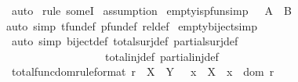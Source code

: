 \begin{isabellebody}
\isamarkupfalse%
\ auto\isanewline
{}\isamarkupfalse%
\ {\isacharparenleft}rule\ someI{\isacharparenright}\isanewline
{}\isamarkupfalse%
\ assumption\isanewline
{}\isamarkupfalse%
%
\endisatagproof
{\isafoldproof}%
%
\isadelimproof
\isanewline
%
\endisadelimproof
\isanewline
{}\isamarkupfalse%
\ empty{\isacharunderscore}is{\isacharunderscore}pfun{\isacharbrackleft}simp{\isacharbrackright}{\isacharcolon}\ {\isachardoublequoteopen}{\isacharbraceleft}{\isacharbraceright}\ {\isasymin}\ A\ {\isacharminus}{\isacharbar}{\isacharminus}{\isachargreater}\ B{\isachardoublequoteclose}\isanewline
%
\isadelimproof
%
\endisadelimproof
%
\isatagproof
{}\isamarkupfalse%
{\isacharparenleft}auto\ simp{\isacharcolon}\ tfun{\isacharunderscore}def\ pfun{\isacharunderscore}def\ rel{\isacharunderscore}def{\isacharparenright}%
\endisatagproof
{\isafoldproof}%
%
\isadelimproof
\isanewline
%
\endisadelimproof
\isanewline
\isanewline
{}\isamarkupfalse%
\ empty{\isacharunderscore}biject{\isacharbrackleft}simp{\isacharbrackright}{\isacharcolon}\ {\isachardoublequoteopen}{\isacharbraceleft}{\isacharbraceright}\ {\isacharcolon}\ {\isacharparenleft}{\isacharbraceleft}{\isacharbraceright}\ {\isachargreater}{\isacharminus}{\isacharminus}{\isachargreater}{\isachargreater}\ {\isacharbraceleft}{\isacharbraceright}{\isacharparenright}{\isachardoublequoteclose}\isanewline
%
\isadelimproof
%
\endisadelimproof
%
\isatagproof
{}\isamarkupfalse%
\ {\isacharparenleft}auto\ simp{\isacharcolon}\ biject{\isacharunderscore}def\ total{\isacharunderscore}surj{\isacharunderscore}def\ partial{\isacharunderscore}surj{\isacharunderscore}def\isanewline
\ \ \ \ \ \ \ \ \ \ \ \ \ \ \ \ \ \ total{\isacharunderscore}inj{\isacharunderscore}def\ partial{\isacharunderscore}inj{\isacharunderscore}def{\isacharparenright}\isanewline
{}\isamarkupfalse%
%
\endisatagproof
{\isafoldproof}%
%
\isadelimproof
\isanewline
%
\endisadelimproof
\isanewline
\isanewline
{}\isamarkupfalse%
\ total{\isacharunderscore}func{\isacharunderscore}dom{\isacharbrackleft}rule{\isacharunderscore}format{\isacharbrackright}{\isacharcolon}\ {\isachardoublequoteopen}r\ {\isacharcolon}\ {\isacharparenleft}X\ {\isacharminus}{\isacharminus}{\isacharminus}{\isachargreater}\ Y{\isacharparenright}\ {\isacharminus}{\isacharminus}{\isachargreater}\ \ x\ {\isacharcolon}\ X\ {\isacharminus}{\isacharminus}{\isachargreater}\ x\ {\isacharcolon}\ dom\ r{\isachardoublequoteclose}\isanewline
%
\isadelimproof

\end{isabellebody}
